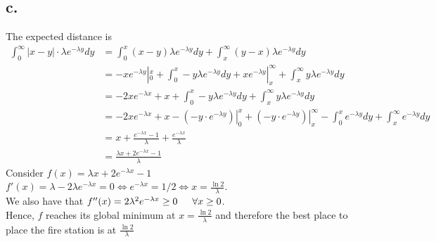 \documentclass[11pt]{article}
\begin{document}
\subsection*{c.}
The expected distance is 
\begin{equation*}
    \begin{aligned}
        \int_0^\infty |x-y| \cdot \lambda e^{-\lambda y}dy  
        &= \int_0^x (x-y) \lambda e^{-\lambda y} dy  + \int_x^\infty (y-x) \lambda e^{-\lambda y} dy \\
        &= -xe^{-\lambda y} |^x_0+ \int_0^x -y\lambda e^{-\lambda y} dy  + xe^{-\lambda y}|^\infty_x  + \int_x^\infty y\lambda e^{-\lambda y} dy\\
        &=  -2xe^{-\lambda x} + x +  \int_0^x -y\lambda e^{-\lambda y} dy  + \int_x^\infty y\lambda e^{-\lambda y} dy\\
        &= -2xe^{-\lambda x} + x - \left.\left(-y \cdot e^{-\lambda y}\right)\right|_0^x + \left.\left(-y \cdot e^{-\lambda y}\right)\right|_x^\infty - \int_0^x e^{-\lambda y} dy + \int_x^\infty e^{-\lambda y} dy \\
        &=  x + \frac{e^{-\lambda x}-1}{\lambda} + \frac{e^{-\lambda x}}{\lambda} \\ 
        &=  \frac{\lambda x+2e^{-\lambda x}-1}{\lambda}
    \end{aligned}
\end{equation*}
Consider $f(x) = \lambda x + 2e^{-\lambda x} - 1$ \\
$f'(x) = \lambda - 2 \lambda e^{-\lambda x} = 0 \iff e^{-\lambda x}= 1/2 \iff x = \frac{\ln2}{\lambda}$. \\
We also have that $f''(x) = 2 \lambda^2 e^{-\lambda x} \ge 0 \indent \forall x \ge 0$. \\
Hence, $f$ reaches its global minimum at $x = \frac{\ln2}{\lambda}$ and therefore the best place to place the fire station is at $\frac{\ln 2}{\lambda}$
\end{document}
